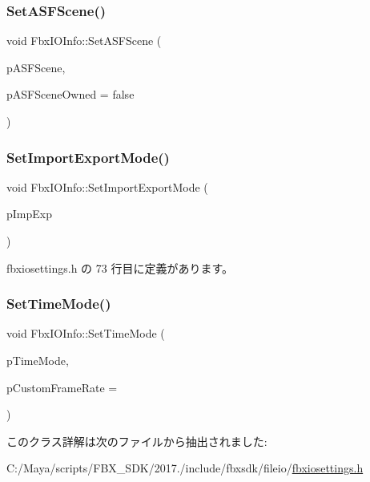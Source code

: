 \mbox{\label{class_fbx_i_o_info_a03a29954f14eb3596b1d887fc68f9bfc}} 
\subsubsection{\texorpdfstring{Set\+A\+S\+F\+Scene()}{SetASFScene()}}
{\footnotesize\ttfamily void Fbx\+I\+O\+Info\+::\+Set\+A\+S\+F\+Scene (\begin{DoxyParamCaption}\item[{\hyperlink{class_fbx_object}{Fbx\+Object} $\ast$}]{p\+A\+S\+F\+Scene,  }\item[{bool}]{p\+A\+S\+F\+Scene\+Owned = {\ttfamily false} }\end{DoxyParamCaption})}

\mbox{\label{class_fbx_i_o_info_a9043330ba9959715f579ff2a614f33c5}} 
\subsubsection{\texorpdfstring{Set\+Import\+Export\+Mode()}{SetImportExportMode()}}
{\footnotesize\ttfamily void Fbx\+I\+O\+Info\+::\+Set\+Import\+Export\+Mode (\begin{DoxyParamCaption}\item[{\hyperlink{class_fbx_i_o_info_a0c167beca637e7a1f723942694d61c75}{E\+Imp\+Exp}}]{p\+Imp\+Exp }\end{DoxyParamCaption})\hspace{0.3cm}{\ttfamily [inline]}}



 fbxiosettings.\+h の 73 行目に定義があります。

\mbox{\label{class_fbx_i_o_info_a6d1d7eda11ddc3d6df891ef2b3039246}} 
\subsubsection{\texorpdfstring{Set\+Time\+Mode()}{SetTimeMode()}}
{\footnotesize\ttfamily void Fbx\+I\+O\+Info\+::\+Set\+Time\+Mode (\begin{DoxyParamCaption}\item[{\hyperlink{class_fbx_time_acc529b00a0e8d4c3da3702449ca93031}{Fbx\+Time\+::\+E\+Mode}}]{p\+Time\+Mode,  }\item[{double}]{p\+Custom\+Frame\+Rate = {} }\end{DoxyParamCaption})}



このクラス詳解は次のファイルから抽出されました\+:\begin{DoxyCompactItemize}
\item 
C\+:/\+Maya/scripts/\+F\+B\+X\+\_\+\+S\+D\+K/2017./include/fbxsdk/fileio/\hyperlink{fbxiosettings_8h}{fbxiosettings.\+h}\end{DoxyCompactItemize}
